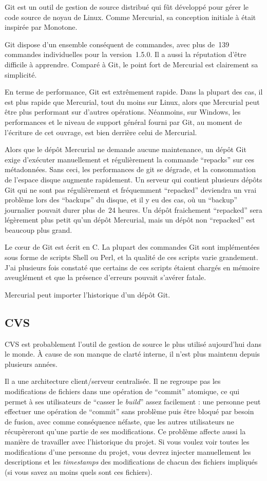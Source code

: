 Git est un outil de gestion de source distribué qui fût développé pour gérer
le code source de noyau de Linux. Comme Mercurial, sa conception initiale à 
était inspirée par Monotone.

Git dispose d'un ensemble conséquent de commandes, avec plus de~139 commandes
individuelles pour la version~1.5.0. Il a aussi la réputation d'être difficile
à apprendre. Comparé à Git, le point fort de Mercurial est clairement sa 
simplicité.

En terme de performance, Git est extrêmement rapide. Dans la plupart des
cas, il est plus rapide que Mercurial, tout du moins sur Linux, alors que 
Mercurial peut être plus performant sur d'autres opérations. Néanmoins, sur
Windows, les performances et le niveau de support général fourni par Git, 
au moment de l'écriture de cet ouvrage, est bien derrière celui de Mercurial.

Alors que le dépôt Mercurial ne demande aucune maintenance, un dépôt Git
exige d'exécuter manuellement et régulièrement la commande ``repacks'' sur
ces métadonnées. Sans ceci, les performances de git se dégrade, et la 
consommation de l'espace disque augmente rapidement. Un serveur qui contient
plusieurs dépôts Git qui ne sont pas régulièrement et fréquemment ``repacked''
deviendra un vrai problème lors des ``backups'' du disque, et il y eu des
cas, où un ``backup'' journalier pouvait durer plus de~24 heures. Un dépôt
fraichement ``repacked'' sera légèrement plus petit qu'un dépôt Mercurial,
mais un dépôt non ``repacked'' est beaucoup plus grand.

Le cœur de Git est écrit en C. La plupart des commandes Git sont implémentées
sous forme de scripts Shell ou Perl, et la qualité de ces scripts varie
grandement. J'ai plusieurs fois constaté que certains de ces scripts étaient
chargés en mémoire aveuglément et que la présence d'erreurs pouvait s'avérer
fatale.

Mercurial peut importer l'historique d'un dépôt Git.

\subsection{CVS}

CVS est probablement l'outil de gestion de source le plus utilisé aujourd'hui
dans le monde. À cause de son manque de clarté interne, il n'est plus 
maintenu depuis plusieurs années.

Il a une architecture client/serveur centralisée. Il ne regroupe pas les
modifications de fichiers dans une opération de ``commit'' atomique, ce
qui permet à ses utilisateurs de ``casser le \textit{build}'' assez
facilement : une personne peut effectuer une opération de ``commit'' 
sans problème puis être bloqué par besoin de fusion, avec comme conséquence
néfaste, que les autres utilisateurs ne récupèreront qu'une partie de ses
modifications. Ce problème affecte aussi la manière de travailler avec 
l'historique du projet. Si vous voulez voir toutes les modifications d'une
personne du projet, vous devrez injecter manuellement les descriptions et les
\textit{timestamps} des modifications de chacun des fichiers impliqués (si
vous savez au moins quels sont ces fichiers).

